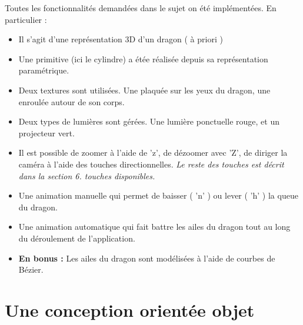 \documentclass{article}
\begin{document}
Toutes les fonctionnalités demandées dans le sujet on été implémentées. En particulier : 
\begin{itemize}
\item Il s'agit d'une représentation 3D d'un dragon ( à priori )
\item Une primitive (ici le cylindre) a étée réalisée depuis sa représentation paramétrique.
\item Deux textures sont utilisées. Une plaquée sur les yeux du dragon, une enroulée autour de son corps.
\item Deux types de lumières sont gérées. Une lumière ponctuelle rouge, et un projecteur vert.
\item Il est possible de zoomer à l'aide de 'z', de dézoomer avec 'Z', de diriger la caméra à l'aide des touches directionnelles. \textit{Le reste des touches est décrit dans la section 6. touches disponibles.}
\item Une animation manuelle qui permet de baisser ( 'n' ) ou lever ( 'h' ) la queue du dragon.
\item Une animation automatique qui fait battre les ailes du dragon tout au long du déroulement de l'application. 
\item \textbf{En bonus :} Les ailes du dragon sont modélisées à l'aide de courbes de Bézier. 
\end{itemize}


\newpage

\section{Une conception orientée objet} %
\end{document}

